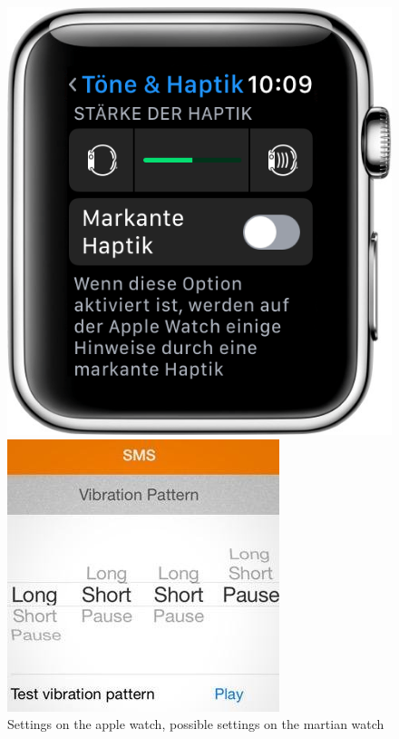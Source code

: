 \begin{figure}[htbp] 
	\centering
	\begin{minipage}[t]{0.4\textwidth}
		\includegraphics[width=\textwidth]{pics/applewatch.png}
	\end{minipage}
	\begin{minipage}[t]{0.4\textwidth}
		\includegraphics[width=\textwidth]{pics/martian.jpg}
	\end{minipage}
	\caption{Settings on the apple watch,  possible settings on the martian watch}
	\label{fig:Bild10}
\end{figure}

